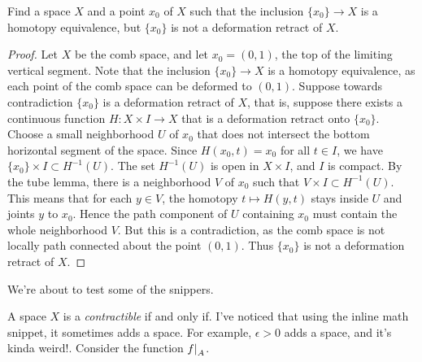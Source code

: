 \documentclass[10pt,oneside,openany]{memoir}
\begin{document}
\begin{exercise}[manual-num={8}]
	Find a space $X$ and a point $x_0$ of $X$ such that the inclusion $\{x_0\} \rightarrow X$ is a homotopy equivalence, but $\{x_0\}$ is not a deformation retract of $X$.
\end{exercise}
\begin{proof}
	Let $X$ be the comb space, and let $x_0 = (0,1)$, the top of the limiting vertical segment. Note that the inclusion $\{x_0\} \rightarrow X$ is a homotopy equivalence, as each point of the comb space can be deformed to $(0,1)$. Suppose towards contradiction $\{x_0\}$ is a deformation retract of $X$, that is, suppose there exists a continuous function $H:X \times I \rightarrow X$ that is a deformation retract onto $\{x_0\}$. Choose a small neighborhood $U$ of $x_0$ that does not intersect the bottom horizontal segment of the space. Since $H(x_0,t) = x_0$ for all $t \in I$, we have $\{x_0\} \times I \subset H^{-1}(U)$. The set $H^{-1}(U)$ is open in $X \times I$, and $I$ is compact. By the tube lemma, there is a neighborhood $V$ of $x_0$ such that $V \times I \subset H^{-1}(U)$. This means that for each $y \in V$, the homotopy $t \mapsto H(y,t)$ stays inside $U$ and joints $y$ to $x_0$. Hence the path component of $U$ containing $x_0$ must contain the whole neighborhood $V$. But this is a contradiction, as the comb space is not locally path connected about the point $(0,1)$. Thus $\{x_0\}$ is not a deformation retract of $X$.
\end{proof}

We're about to test some of the snippers.
\begin{theorem}
	A space $X$ is a \textit{contractible} if and only if. I've noticed that using the inline math snippet, it sometimes adds a space. For example,  $\epsilon > 0$ adds a space, and it's kinda weird!. Consider the function $\restr{f}{A}$. 
\end{theorem}
\end{document}
